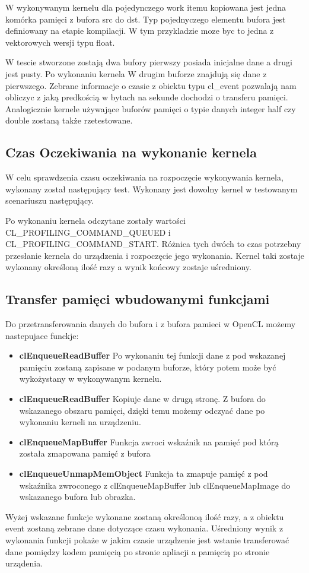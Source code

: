 
 
W wykonywanym kernelu dla pojedynczego work itemu kopiowana jest jedna komórka pamięci z bufora src do dst. Typ pojednyczego elementu bufora jest definiowany na etapie kompilacji. W tym przykladzie moze byc to jedna z vektorowych wersji typu float.

W tescie stworzone zostają dwa bufory pierwszy posiada inicjalne dane a drugi jest pusty. Po wykonaniu kernela W drugim buforze znajdują się dane z pierwszego. Zebrane informacje o czasie z obiektu typu cl\_event pozwalają nam obliczyc z jaką predkością w bytach na sekunde dochodzi o transferu pamięci.
Analogicznie kernele używające buforów pamięci o typie danych integer half czy double zostaną także rzetestowane.

\subsection[Czas Oczekiwania na wykonanie kernela]{Czas Oczekiwania na wykonanie kernela}
W celu sprawdzenia czasu oczekiwania na rozpoczęcie wykonywania kernela, wykonany został następujący test. Wykonany jest dowolny kernel w testowanym scenariuszu następujący.



Po wykonaniu kernela odczytane zostały wartości CL\_PROFILING\_COMMAND\_QUEUED i CL\_PROFILING\_COMMAND\_START. Różnica tych dwóch to czas potrzebny przesłanie kernela do urządzenia i rozpoczęcie jego wykonania. Kernel taki zostaje wykonany określoną ilość razy a wynik końcowy zostaje uśredniony.
\subsection[Transfer pamięci wbudowanymi funkcjami]{Transfer pamięci wbudowanymi funkcjami}
Do przetransferowania danych do bufora i z bufora pamieci w OpenCL możemy nastepujace funckje:
 \begin{itemize}
	\item \textbf{clEnqueueReadBuffer} Po wykonaniu tej funkcji dane z pod wskazanej pamięciu zostaną zapisane w podanym buforze, który potem może być wykożystany w wykonywanym kernelu.
	\item \textbf{clEnqueueReadBuffer} Kopiuje dane w drugą stronę. Z bufora do wskazanego obszaru pamięci, dzięki temu możemy odczyać dane po wykonaniu kerneli na urządzeniu.
	\item \textbf{clEnqueueMapBuffer} Funkcja zwroci wskaźnik na pamięć pod którą została zmapowana pamięć z bufora
	\item \textbf{clEnqueueUnmapMemObject} Funkcja ta zmapuje pamięć z pod wskaźnika zwroconego z clEnqueueMapBuffer lub clEnqueueMapImage do wskazanego bufora lub obrazka.
\end{itemize}
Wyżej wskazane funkcje wykonane zostaną określonoą ilość razy, a z obiektu event zostaną zebrane dane dotyczące czasu wykonania. Uśredniony wynik z wykonania funkcji pokaże w jakim czasie urządzenie jest wstanie transferować dane pomiędzy kodem pamięcią po stronie apliacji a pamięcią po stronie urządenia.
